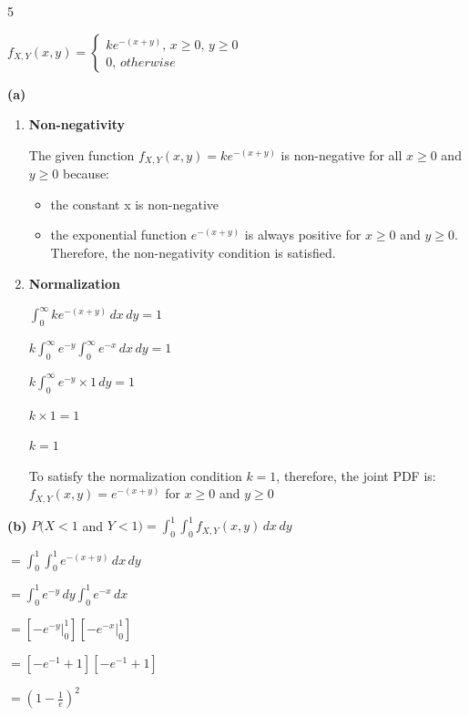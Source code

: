 \documentclass[12 pt]{article}
\begin{document}
    \begin{exercise}{5}
    \hfill

    $f_{X,Y}(x,y) = \begin{cases}
        k e^{-(x+y)}, \, x \geq 0, \, y \geq 0 \\
        0, \, otherwise
    \end{cases}$

    \textbf{(a)} 
    \begin{enumerate}
        \item \textbf{Non-negativity}

        The given function $f_{X,Y}(x,y) = k e^{-(x+y)}$ is non-negative for all $x \geq 0$ and $y \geq 0$ because:
        \begin{itemize}
            \item the constant x is non-negative
            \item the exponential function $e^{-(x+y)}$ is always positive for $x \geq 0$ and $y \geq 0$. Therefore, the non-negativity condition is satisfied.
        \end{itemize}

        \item \textbf{Normalization}

        $\int_{0}^{\infty} k e^{-(x+y)} \, dx \, dy = 1$

        $k \int_{0}^{\infty} e^{-y} \int_{0}^{\infty} e^{-x} \, dx \, dy = 1$

        $k \int_{0}^{\infty} e^{-y} \times 1 \, dy = 1$

        $k \times 1 = 1$

        $k = 1$

        \hfill

        To satisfy the normalization condition $k=1$, therefore, the joint PDF is:
        $f_{X,Y}(x,y) = e^{-(x+y)}$ for $x \geq 0$ and $y \geq 0$
    \end{enumerate}

    \hfill

    \textbf{(b)} $P(X<1$ and $Y<1) = \int_{0}^{1} \int_{0}^{1} f_{X,Y}(x,y) \, dx \, dy$

    $= \int_{0}^{1} \int_{0}^{1} e^{-(x+y)} \, dx \, dy$

    $= \int_{0}^{1} e^{-y} \, dy \int_{0}^{1} e^{-x} \, dx$

    $= [-e^{-y} |_{0}^{1}][-e^{-x} |_{0}^{1}]$

    $= [-e^{-1} + 1][-e^{-1} + 1]$

    $= (1 - \frac{1}{e})^2$


\end{exercise}
\end{document}
